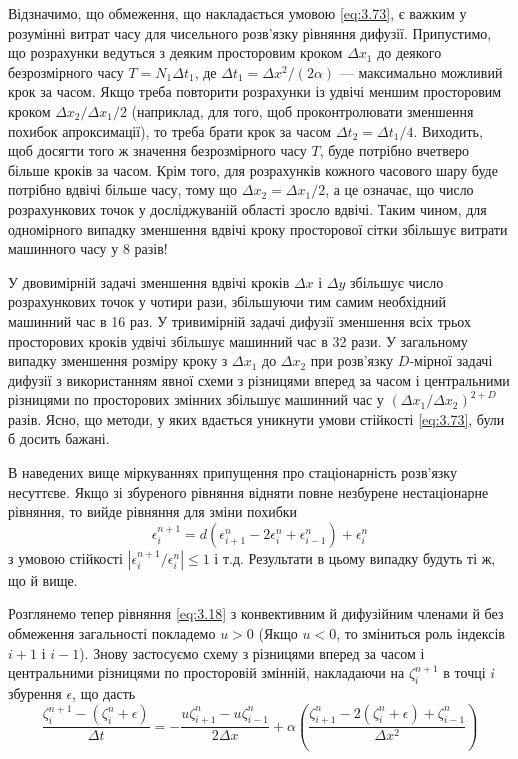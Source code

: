 Відзначимо, що обмеження, що накладається умовою \eqref{eq:3.73}, є важким у розумінні витрат часу для чисельного розв'язку рівняння дифузії. Припустимо, що розрахунки ведуться з деяким просторовим кроком $\Delta x_1$ до деякого безрозмірного часу $T = N_1 \Delta t_1$, де $\Delta t_1 = \Delta x^2 / (2 \alpha)$ --- максимально можливий крок за часом. Якщо треба повторити розрахунки із удвічі меншим просторовим кроком $\Delta x_2 / \Delta x_1 / 2$ (наприклад, для того, щоб проконтролювати зменшення похибок апроксимації), то треба брати крок за часом $\Delta t_2 = \Delta t_1 / 4$. Виходить, щоб досягти того ж значення безрозмірного часу $T$, буде потрібно вчетверо більше кроків за часом. Крім того, для розрахунків кожного часового шару буде потрібно вдвічі більше часу, тому що $\Delta x_2 = \Delta x_1 / 2$, а це означає, що число розрахункових точок у досліджуваній області зросло вдвічі. Таким чином, для одномірного випадку зменшення вдвічі кроку просторової сітки збільшує витрати машинного часу у 8 разів! \medskip

У двовимірній задачі зменшення вдвічі кроків $\Delta x$ і $\Delta y$ збільшує число розрахункових точок у чотири рази, збільшуючи тим самим необхідний машинний час в 16 раз. У тривимірній задачі дифузії зменшення всіх трьох просторових кроків удвічі збільшує машинний час в 32 рази. У загальному випадку зменшення розміру кроку з $\Delta x_1$ до $\Delta x_2$ при розв'язку $D$-мірної задачі дифузії з використанням явної схеми з різницями вперед за часом і центральними різницями по просторових змінних збільшує машинний час у $(\Delta x_1 / \Delta x_2)^{2 + D}$ разів. Ясно, що методи, у яких вдається уникнути умови стійкості \eqref{eq:3.73}, були б досить бажані. \medskip

В наведених вище міркуваннях припущення про стаціонарність розв'язку несуттєве. Якщо зі збуреного рівняння відняти повне незбурене нестаціонарне рівняння, то вийде рівняння для зміни похибки
\begin{equation}
    \epsilon_i^{n + 1} = d (\epsilon_{i + 1}^n - 2 \epsilon_i^n + \epsilon_{i - 1}^n) + \epsilon_i^n
\end{equation}
з умовою стійкості $|\epsilon_i^{n + 1} / \epsilon_i^n| \le 1$ і т.д. Результати в цьому випадку будуть ті ж, що й вище. \medskip

Розглянемо тепер рівняння \eqref{eq:3.18} з конвективним й дифузійним членами й без обмеження загальності покладемо $u > 0$ (Якщо $u < 0$, то зміниться роль індексів $i + 1$ і $i - 1$). Знову застосуємо схему з різницями вперед за часом і центральними різницями по просторовій змінній, накладаючи на $\zeta_i^{n + 1}$ в точці $i$ збурення $\epsilon$, що дасть
\begin{equation}
    \label{eq:3.75}
    \frac{\zeta_i^{n + 1} - (\zeta_i^n + \epsilon)}{\Delta t} = - \frac{u \zeta_{i + 1}^n - u \zeta_{i - 1}^n}{2 \Delta x} + \alpha \left( \frac{\zeta_{i + 1}^n - 2 (\zeta_i^n + \epsilon) + \zeta_{i - 1}^n}{\Delta x^2} \right)
\end{equation}

